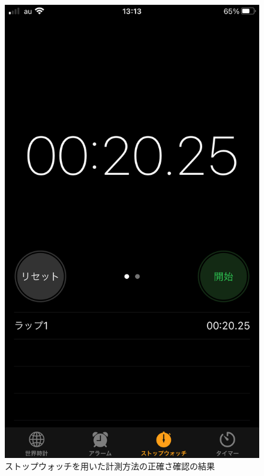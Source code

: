 \begin{enumerate}
\begin{itemize}
\begin{itemize}
\begin{figure}[htbp]
\begin{minipage}[t]{0.5\hsize}
        \end{minipage}
        \begin{minipage}[t]{0.45\hsize}
          \centering
          \caption{ストップウォッチを用いた計測方法の正確さ確認の結果}
          \label{graph:8}
          \includegraphics[scale=0.1]{計測方法の正確さを確認2結果.PNG}
        \end{minipage}
      \end{figure}
    \end{itemize}

\end{itemize}
\end{enumerate}
